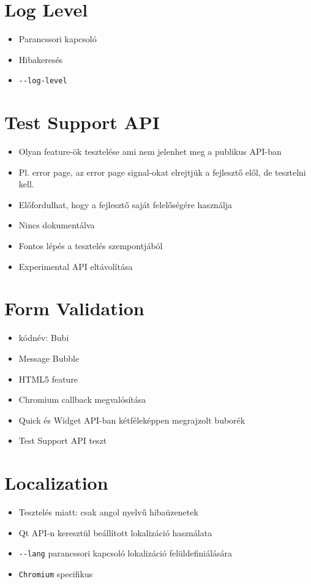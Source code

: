 \documentclass[12pt]{report}
\begin{document}
\section{Log Level}
\begin{itemize}
    \item Parancssori kapcsoló
    \item Hibakeresés
    \item \texttt{-{}-log-level}
\end{itemize}
\pagebreak

\section{Test Support API}
\begin{itemize}
    \item Olyan feature-ök tesztelése ami nem jelenhet meg a publikus API-ban
    \item Pl. error page, az error page signal-okat elrejtjük a fejlesztő elől, de tesztelni
        kell.
    \item Előfordulhat, hogy a fejlesztő saját felelőségére használja
    \item Nincs dokumentálva
    \item Fontos lépés a tesztelés szempontjából
    \item Experimental API eltávolítása
\end{itemize}
\pagebreak

\section{Form Validation}
\begin{itemize}
    \item kódnév: Bubi
    \item Message Bubble
    \item HTML5 feature
    \item Chromium callback megvalósítása
    \item Quick és Widget API-ban kétféleképpen megrajzolt buborék
    \item Test Support API teszt
\end{itemize}
\pagebreak

\section{Localization}
\begin{itemize}
    \item Tesztelés miatt: csak angol nyelvű hibaüzenetek
    \item Qt API-n keresztül beállított lokalizáció használata
    \item \texttt{-{}-lang} parancssori kapcsoló lokalizáció felüldefiniálására
    \item \texttt{Chromium} specifikus
\end{itemize}
\pagebreak
\end{document}
